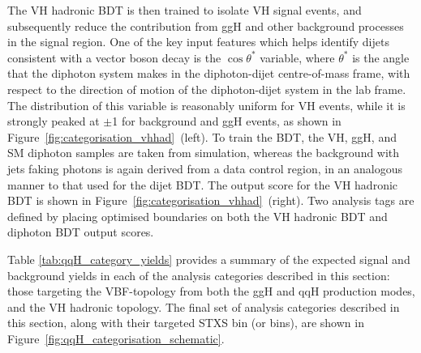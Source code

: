 The VH hadronic BDT is then trained to isolate VH signal events, and subsequently reduce the contribution from ggH and other background processes in the signal region. One of the key input features which helps identify dijets consistent with a vector boson decay is the $\cos{\theta^*}$ variable, where $\theta^*$ is the angle that the diphoton system makes in the diphoton-dijet centre-of-mass frame, with respect to the direction of motion of the diphoton-dijet system in the lab frame. The distribution of this variable is reasonably uniform for VH events, while it is strongly peaked at $\pm$1 for background and ggH events, as shown in Figure~\ref{fig:categorisation_vhhad}~(left). To train the BDT, the VH, ggH, and SM diphoton samples are taken from simulation, whereas the background with jets faking photons is again derived from a data control region, in an analogous manner to that used for the dijet BDT. The output score for the VH hadronic BDT is shown in Figure~\ref{fig:categorisation_vhhad}~(right). Two analysis tags are defined by placing optimised boundaries on both the VH hadronic BDT and diphoton BDT output scores. 


Table \ref{tab:qqH_category_yields} provides a summary of the expected signal and background yields in each of the analysis categories described in this section: those targeting the VBF-topology from both the ggH and qqH production modes, and the VH hadronic topology. The final set of analysis categories described in this section, along with their targeted STXS bin (or bins), are shown in Figure~\ref{fig:qqH_categorisation_schematic}.

